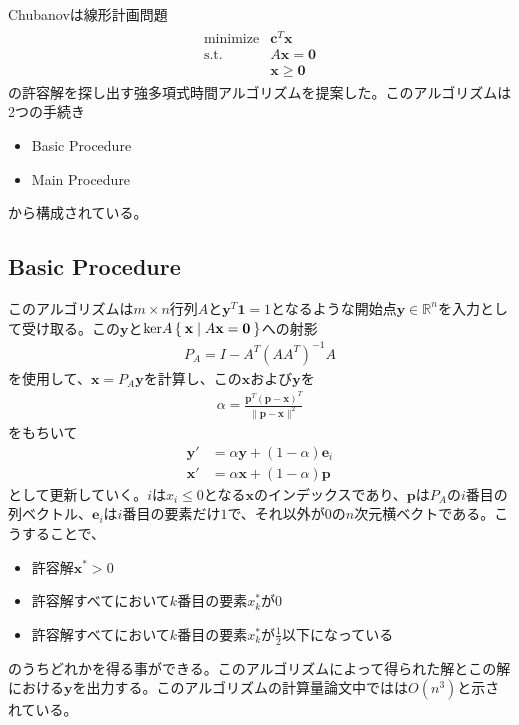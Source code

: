 Chubanovは線形計画問題
\begin{align*}
  \begin{array}{ll}
    \text{minimize} & \mathbf{c}^T \mathbf{x} \\
    \text{s.t.}     & A \mathbf{x} = \mathbf{0} \\
                    & \mathbf{x} \geq \mathbf{0}
  \end{array}
\end{align*}
の許容解を探し出す強多項式時間アルゴリズムを提案した。このアルゴリズムは2つの手続き
\begin{itemize}
  \item Basic Procedure
  \item Main Procedure
\end{itemize}
から構成されている。

\subsection{Basic Procedure}
このアルゴリズムは$m \times n$行列$A$と$\mathbf{y}^T \mathbf{1} = 1$となるような開始点$\mathbf{y} \in \mathbb{R}^n$を入力として受け取る。この$\mathbf{y}$と$\mathrm{ker}A \Set{\mathbf{x} | A \mathbf{x} = \mathbf{0}}$への射影
\begin{align*}
  P_A = I - A^T \left(A A^T\right)^{-1} A
\end{align*}
を使用して、$\mathbf{x} = P_A \mathbf{y}$を計算し、この$\mathbf{x}$および$\mathbf{y}$を
\begin{align*}
  \alpha = \frac{\mathbf{p}^T \left(\mathbf{p} - \mathbf{x}\right)^T}{\|\mathbf{p} - \mathbf{x}\|^2}
\end{align*}
をもちいて
\begin{align*}
  \mathbf{y}' & = \alpha \mathbf{y} + \left(1 - \alpha\right) \mathbf{e}_i \\
  \mathbf{x}' & = \alpha \mathbf{x} + \left(1 - \alpha\right) \mathbf{p}
\end{align*}
として更新していく。$i$は$x_i \leq 0$となる$\mathbf{x}$のインデックスであり、$\mathbf{p}$は$P_A$の$i$番目の列ベクトル、$\mathbf{e}_i$は$i$番目の要素だけ$1$で、それ以外が$0$の$n$次元横ベクトである。こうすることで、
\begin{itemize}
  \item 許容解$\mathbf{x}^* > 0$
  \item 許容解すべてにおいて$k$番目の要素$x_k^*$が$0$
  \item 許容解すべてにおいて$k$番目の要素$x_k^*$が$\frac{1}{2}$以下になっている
\end{itemize}
のうちどれかを得る事ができる。このアルゴリズムによって得られた解とこの解における$\mathbf{y}$を出力する。このアルゴリズムの計算量論文中ではは$O(n^3)$と示されている。

